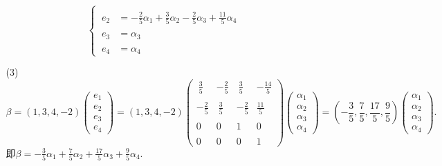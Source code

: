 \documentclass{article}
\begin{document}
\begin{enumerate}
\begin{enumerate}
\[\begin{cases}
                 & \\
                \ e_2 & =\displaystyle{-\frac{2}{5}\alpha_1+\frac{3}{5}\alpha_2-\frac{2}{5}\alpha_3+\frac{11}{5}\alpha_4}\\
                 & \\
                \ e_3 & =\alpha_3\\
                 & \\
                \ e_4 & =\alpha_4
            \end{cases}
        \]
        \item [(3)]
        \[
            \beta=(1,3,4,-2)
            \begin{pmatrix}
                e_1\\
                e_2\\
                e_3\\
                e_4
            \end{pmatrix}
            =(1,3,4,-2)
            \begin{pmatrix}
                \ \displaystyle{\frac{3}{5}} &\displaystyle{-\frac{2}{5}}  & \ \displaystyle{\frac{3}{5}} & \displaystyle{-\frac{14}{5}}\\
                & & & \\
                \displaystyle{-\frac{2}{5}} & \ \displaystyle{\frac{3}{5}} & \displaystyle{-\frac{2}{5}} & \displaystyle{\frac{11}{5}}\\
                & & & \\
                0 & 0 & 1 & 0\\
                & & & \\
                0 & 0 & 0 & 1
            \end{pmatrix}
            \begin{pmatrix}
                \alpha_1\\
                \alpha_2\\
                \alpha_3\\
                \alpha_4
            \end{pmatrix}
            =\left(-\frac{3}{5},\frac{7}{5},\frac{17}{5},\frac{9}{5}\right)
            \begin{pmatrix}
                \alpha_1\\
                \alpha_2\\
                \alpha_3\\
                \alpha_4
            \end{pmatrix}.
        \]
        即$\beta=\displaystyle{-\frac{3}{5}\alpha_1+\frac{7}{5}\alpha_2+\frac{17}{5}\alpha_3+\frac{9}{5}\alpha_4}$.
    \end{enumerate}
\end{enumerate}
\end{document}
